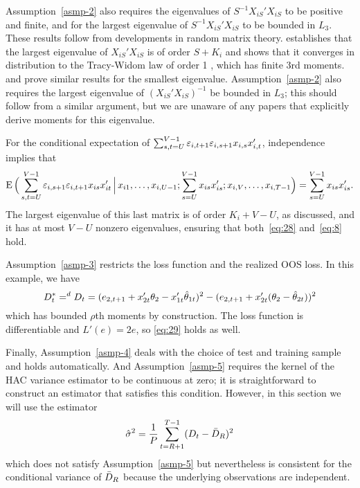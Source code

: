 \documentclass[12pt,draft]{article}
\begin{document}
Assumption~\ref{asmp-2} also requires the eigenvalues of $S^{-1}
X_{iS}'X_{iS}$ to be positive and finite, and for the largest
eigenvalue of $S^{-1} X_{iS}'X_{iS}$ to be bounded in $L_3$.  These
results follow from developments in random matrix theory.
\citet{Gem:80} establishes that the largest eigenvalue of
$X_{iS}'X_{iS}$ is of order $S + K_i$ and \citet{Joh:01} shows that it
converges in distribution to the Tracy-Widom law of order 1
\citep{TrW:96}, which has finite 3rd moments. \citet{Sil:85} and
\citet{BFP:98} prove similar results for the smallest eigenvalue.
Assumption~\ref{asmp-2} also requires the largest eigenvalue of
$(X_{iS}'X_{iS})^{-1}$ be bounded in $L_3$; this should follow from a
similar argument, but we are unaware of any papers that explicitly
derive moments for this eigenvalue.

For the conditional expectation of %
$\sum_{s,t=U}^{V-1} \varepsilon_{i,t+1} \varepsilon_{i,s+1} x_{i,s} x_{i,t}'$,
independence implies that
\begin{equation*}
  \operatorname{E}\Big(
  \sum_{s,t=U}^{V-1} \varepsilon_{i,s+1} \varepsilon_{i,t+1} x_{is}x_{it}'
  \,\Big|\,
  x_{i1},\dots,x_{i,U-1};
  \sum_{s=U}^{V-1} x_{is} x_{is}';
  x_{i,V},\dots,x_{i,T-1}
  \Big)
  = \sum_{s=U}^{V-1} x_{is} x_{is}'.
\end{equation*}
The largest eigenvalue of this last matrix is of order $K_i + V - U$,
as discussed, and it has at most $V - U$ nonzero eigenvalues,
ensuring that both~\eqref{eq:28} and~\eqref{eq:8} hold.

Assumption~\ref{asmp-3} restricts the loss function and the realized
OOS loss. In this example, we have
\begin{equation*}
  D_t^* =^d D_t = (e_{2,t+1} + x_{2t}'\theta_2 - x_{1t}'\hat\theta_{1t})^2
  - (e_{2,t+1} + x_{2t}'(\theta_2 - \hat\theta_{2t}))^2
\end{equation*}
which has bounded $\rho$th moments by construction. The loss function
is differentiable and $L'(e) = 2 e$, so \eqref{eq:29} holds as well.

Finally, Assumption~\ref{asmp-4} deals with the choice of test and
training sample and holds automatically. And Assumption~\ref{asmp-5}
requires the kernel of the HAC variance estimator to be continuous at
zero; it is straightforward to construct an estimator that satisfies
this condition. However, in this section we will use the estimator
\begin{equation*}
  \hat{\sigma}^2 = \frac{1}{P} \sum_{t=R+1}^{T-1} (D_t - \bar{D}_{R})^2
\end{equation*}
which does not satisfy Assumption~\ref{asmp-5} but nevertheless is
consistent for the conditional variance of $\bar{D}_{R}$ because the
underlying observations are independent.
\end{document}
